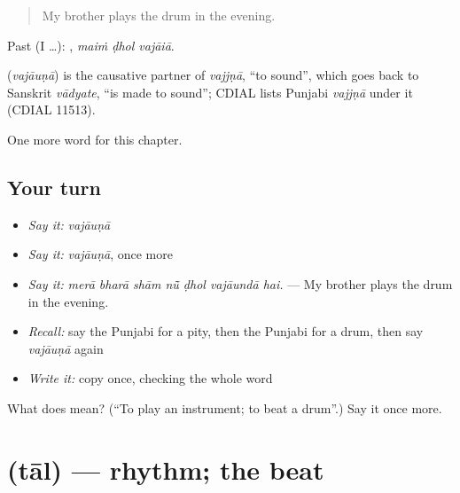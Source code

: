\begin{quote}
My brother plays the drum in the evening.
\end{quote}

Past (I …):   , \emph{maiṁ ḍhol vajāiā}.

\begin{cousinweb}
\textbf{} (\emph{vajāuṇā}) is the causative partner of \emph{vajjṇā}, \textquotedblleft{}to sound\textquotedblright{}, which goes back to Sanskrit \emph{vādyate}, \textquotedblleft{}is made to sound\textquotedblright{}; CDIAL lists Punjabi \emph{vajjṇā} under it (CDIAL 11513).
\end{cousinweb}

\begin{grammarlens}[title={What you've built}]
One more word for this chapter.
\end{grammarlens}

\subsection*{Your turn}
\begin{itemize}
\raggedright
  \item \emph{Say it:} \emph{vajāuṇā}
  \item \emph{Say it:} \emph{vajāuṇā}, once more
  \item \emph{Say it:} \emph{merā bharā shām nū̃ ḍhol vajāundā hai.} — My brother plays the drum in the evening.
  \item \emph{Recall:} say the Punjabi for a pity, then the Punjabi for a drum, then say \emph{vajāuṇā} again
  \item \emph{Write it:} copy \textbf{} once, checking the whole word
\end{itemize}

\begin{tcolorbox}[breakable,colback=teal!4,colframe=teal!35!black,title={Before you move on}]
What does  mean? (\textquotedblleft{}To play an instrument; to beat a drum\textquotedblright{}.) Say it once more.
\end{tcolorbox}
\section[\texorpdfstring{\pa{ਤਾਲ} (tāl)}{ਤਾਲ (tāl)}]{ (tāl) — rhythm; the beat}

\label{lesson:PA-C347-tal}



